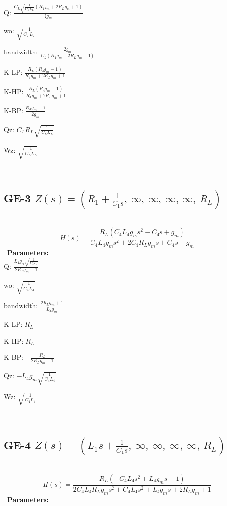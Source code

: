 \documentclass{article}
\begin{document}
Q: $\frac{C_{L} \sqrt{\frac{1}{C_{L} L_{L}}} \left(R_{4} g_{m} + 2 R_{L} g_{m} + 1\right)}{2 g_{m}}$\ 

wo: $\sqrt{\frac{1}{C_{L} L_{L}}}$\ 

bandwidth: $\frac{2 g_{m}}{C_{L} \left(R_{4} g_{m} + 2 R_{L} g_{m} + 1\right)}$\ 

K-LP: $\frac{R_{L} \left(R_{4} g_{m} - 1\right)}{R_{4} g_{m} + 2 R_{L} g_{m} + 1}$\ 

K-HP: $\frac{R_{L} \left(R_{4} g_{m} - 1\right)}{R_{4} g_{m} + 2 R_{L} g_{m} + 1}$\ 

K-BP: $\frac{R_{4} g_{m} - 1}{2 g_{m}}$\ 

Qz: $C_{L} R_{L} \sqrt{\frac{1}{C_{L} L_{L}}}$\ 

Wz: $\sqrt{\frac{1}{C_{L} L_{L}}}$\ 

\ 

\subsection{GE-3 $Z(s) = \left( R_{1} + \frac{1}{C_{1} s}, \  \infty, \  \infty, \  \infty, \  \infty, \  R_{L}\right)$ } \ 
\textbf{\[H(s) = \frac{R_{L} \left(C_{4} L_{4} g_{m} s^{2} - C_{4} s + g_{m}\right)}{C_{4} L_{4} g_{m} s^{2} + 2 C_{4} R_{L} g_{m} s + C_{4} s + g_{m}}\] } \ 
\textbf{Parameters:}\\ 

Q: $\frac{L_{4} g_{m} \sqrt{\frac{1}{C_{4} L_{4}}}}{2 R_{L} g_{m} + 1}$\ 

wo: $\sqrt{\frac{1}{C_{4} L_{4}}}$\ 

bandwidth: $\frac{2 R_{L} g_{m} + 1}{L_{4} g_{m}}$\ 

K-LP: $R_{L}$\ 

K-HP: $R_{L}$\ 

K-BP: $- \frac{R_{L}}{2 R_{L} g_{m} + 1}$\ 

Qz: $- L_{4} g_{m} \sqrt{\frac{1}{C_{4} L_{4}}}$\ 

Wz: $\sqrt{\frac{1}{C_{4} L_{4}}}$\ 

\ 

\subsection{GE-4 $Z(s) = \left( L_{1} s + \frac{1}{C_{1} s}, \  \infty, \  \infty, \  \infty, \  \infty, \  R_{L}\right)$ } \ 
\textbf{\[H(s) = \frac{R_{L} \left(- C_{4} L_{4} s^{2} + L_{4} g_{m} s - 1\right)}{2 C_{4} L_{4} R_{L} g_{m} s^{2} + C_{4} L_{4} s^{2} + L_{4} g_{m} s + 2 R_{L} g_{m} + 1}\] } \ 
\textbf{Parameters:}\\ 
\end{document}
